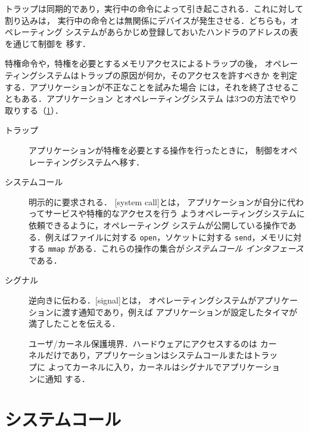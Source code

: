 \documentclass[../main.tex]{subfiles}
\begin{document}
トラップは同期的であり，実行中の命令によって引き起こされる．これに対して割り込みは，
実行中の命令とは無関係にデバイスが発生させる．どちらも，オペレーティング
システムがあらかじめ登録しておいたハンドラのアドレスの表を通じて制御を
移す．

特権命令や，特権を必要とするメモリアクセスによるトラップの後，
オペレーティングシステムはトラップの原因が何か，そのアクセスを許すべきか
を判定する．アプリケーションが不正なことを試みた場合
には，それを終了させることもある．アプリケーション
とオペレーティングシステム
は3つの方法でやり取りする（\cref{fig:l01-user-kernel}）．
\begin{description}
  \item[トラップ] アプリケーションが特権を必要とする操作を行ったときに，
    制御をオペレーティングシステムへ移す．
  \item[システムコール] 明示的に要求される．
    [system call]とは，
    アプリケーションが自分に代わってサービスや特権的なアクセスを行う
    ようオペレーティングシステムに依頼できるように，オペレーティング
    システムが公開している操作である．例えばファイルに対する
    \texttt{open}，ソケットに対する \texttt{send}，メモリに対する
    \texttt{mmap} がある．これらの操作の集合が\emph{システムコール
    インタフェース}である．
  \item[シグナル] 逆向きに伝わる．[signal]とは，
    オペレーティングシステムがアプリケーションに渡す通知であり，例えば
    アプリケーションが設定したタイマが満了したことを伝える．
\end{description}

\begin{figure}[htbp]
  \centering
  
  \caption{ユーザ/カーネル保護境界．ハードウェアにアクセスするのは
    カーネルだけであり，アプリケーションはシステムコールまたはトラップに
    よってカーネルに入り，カーネルはシグナルでアプリケーションに通知
    する．}
  \label{fig:l01-user-kernel}
\end{figure}

\section{システムコール}
\label{sec:l01-syscalls}
\end{document}
